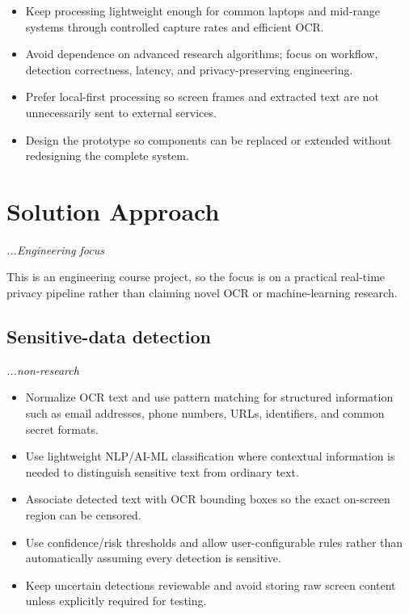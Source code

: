 \documentclass[12pt,a4paper]{article}
\begin{document}
\begin{itemize}
    \item Keep processing lightweight enough for common laptops and mid-range systems through controlled capture rates and efficient OCR.

    \item Avoid dependence on advanced research algorithms; focus on workflow, detection correctness, latency, and privacy-preserving engineering.

    \item Prefer local-first processing so screen frames and extracted text are not unnecessarily sent to external services.

    \item Design the prototype so components can be replaced or extended without redesigning the complete system.
\end{itemize}

\section{Solution Approach}
\hfill{\itshape\fontsize{8.3}{9.5}\selectfont ...Engineering focus}

This is an engineering course project, so the focus is on a practical real-time privacy pipeline rather than claiming novel OCR or machine-learning research.

\subsection{Sensitive-data detection}
\hfill{\itshape\fontsize{8.3}{9.5}\selectfont ...non-research}

\begin{itemize}
    \item Normalize OCR text and use pattern matching for structured information such as email addresses, phone numbers, URLs, identifiers, and common secret formats.

    \item Use lightweight NLP/AI-ML classification where contextual information is needed to distinguish sensitive text from ordinary text.

    \item Associate detected text with OCR bounding boxes so the exact on-screen region can be censored.

    \item Use confidence/risk thresholds and allow user-configurable rules rather than automatically assuming every detection is sensitive.

    \item Keep uncertain detections reviewable and avoid storing raw screen content unless explicitly required for testing.
\end{itemize}
\end{document}
